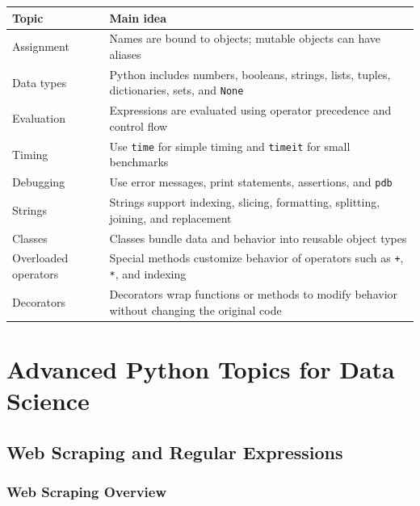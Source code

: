 \documentclass[12pt,oneside]{book}
\numberwithin{equation}{section}
\theoremstyle{definition}
\theoremstyle{plain}
\theoremstyle{remark}
\begin{document}
\begin{center}
\begin{xltabular}{\textwidth}{>{\raggedright\arraybackslash}p{0.28\textwidth}
>{\raggedright\arraybackslash}X}
\toprule
Topic & Main idea \\
\midrule
Assignment
& Names are bound to objects; mutable objects can have aliases \\

Data types
& Python includes numbers, booleans, strings, lists, tuples, dictionaries, sets, and \texttt{None} \\

Evaluation
& Expressions are evaluated using operator precedence and control flow \\

Timing
& Use \texttt{time} for simple timing and \texttt{timeit} for small benchmarks \\

Debugging
& Use error messages, print statements, assertions, and \texttt{pdb} \\

Strings
& Strings support indexing, slicing, formatting, splitting, joining, and replacement \\

Classes
& Classes bundle data and behavior into reusable object types \\

Overloaded operators
& Special methods customize behavior of operators such as \texttt{+}, \texttt{*}, and indexing \\

Decorators
& Decorators wrap functions or methods to modify behavior without changing the original code \\
\bottomrule
\end{xltabular}
\end{center}

\chapter{Advanced Python Topics for Data Science}

\section{Web Scraping and Regular Expressions}

\subsection{Web Scraping Overview}
\end{document}
